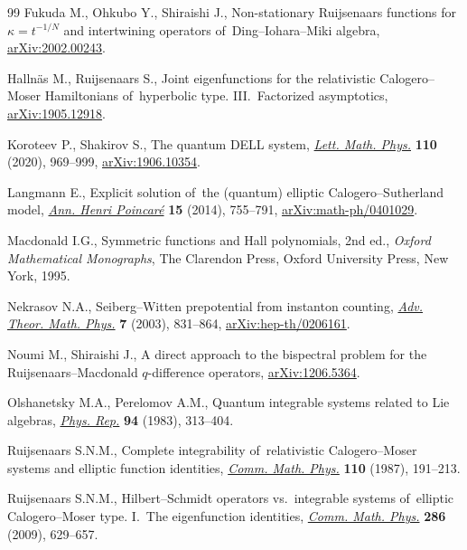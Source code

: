 \documentclass[pdftex]{sigma}%
\numberwithin{equation}{section}
\begin{document}
\begin{thebibliography}{99}
Fukuda M., Ohkubo Y., Shiraishi J., Non-stationary Ruijsenaars functions for
 $\kappa=t^{-1/N}$ and intertwining operators of~Ding--Iohara--Miki algebra,
 \href{https://arxiv.org/abs/2002.00243}{arXiv:2002.00243}.

Halln\"as M., Ruijsenaars S., Joint eigenfunctions for the relativistic
 Calogero--Moser Hamiltonians of~hyperbolic type. III.~Factorized asymptotics,
 \href{https://arxiv.org/abs/1905.12918}{arXiv:1905.12918}.

Koroteev P., Shakirov S., The quantum {DELL} system, \href{https://doi.org/10.1007/s11005-019-01247-y}{\textit{Lett. Math. Phys.}}
 \textbf{110} (2020), 969--999, \href{https://arxiv.org/abs/1906.10354}{arXiv:1906.10354}.

Langmann E., Explicit solution of~the (quantum) elliptic
 {C}alogero--{S}utherland model, \href{https://doi.org/10.1007/s00023-013-0254-8}{\textit{Ann. Henri Poincar\'e}} \textbf{15}
 (2014), 755--791, \href{https://arxiv.org/abs/math-ph/0401029}{arXiv:math-ph/0401029}.

Macdonald I.G., Symmetric functions and {H}all polynomials, 2nd ed., \textit{Oxford
 Mathematical Monographs}, The Clarendon Press, Oxford University Press, New
 York, 1995.

Nekrasov N.A., Seiberg--{W}itten prepotential from instanton counting,
 \href{https://doi.org/10.4310/ATMP.2003.v7.n5.a4}{\textit{Adv. Theor. Math. Phys.}} \textbf{7} (2003), 831--864,
 \href{https://arxiv.org/abs/hep-th/0206161}{arXiv:hep-th/0206161}.

Noumi M., Shiraishi J., A direct approach to the bispectral problem for the
 Ruijsenaars--Macdonald $q$-difference operators, \href{https://arxiv.org/abs/1206.5364}{arXiv:1206.5364}.

Olshanetsky M.A., Perelomov A.M., Quantum integrable systems related to {L}ie
 algebras, \href{https://doi.org/10.1016/0370-1573(83)90018-2}{\textit{Phys. Rep.}} \textbf{94} (1983), 313--404.

Ruijsenaars S.N.M., Complete integrability of~relativistic {C}alogero--{M}oser
 systems and elliptic function identities, \href{https://doi.org/10.1007/BF01207363}{\textit{Comm. Math. Phys.}}
 \textbf{110} (1987), 191--213.

Ruijsenaars S.N.M., Hilbert--{S}chmidt operators vs.\ integrable systems of~elliptic {C}alogero--{M}oser type. {I}.~{T}he eigenfunction identities,
 \href{https://doi.org/10.1007/s00220-008-0707-y}{\textit{Comm. Math. Phys.}} \textbf{286} (2009), 629--657.


\end{thebibliography}
\end{document}
